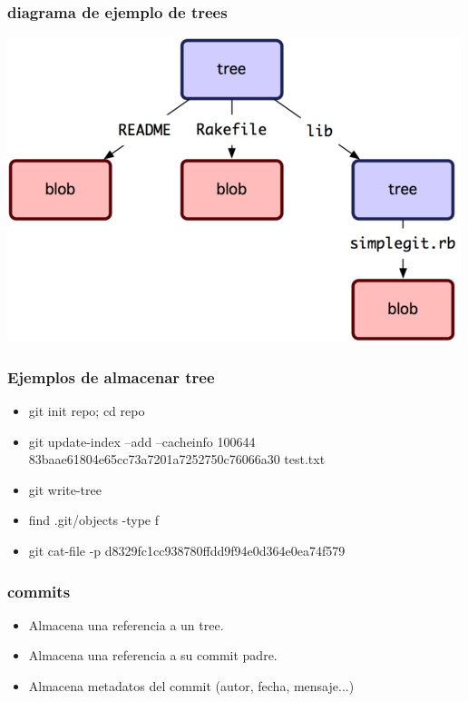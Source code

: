 \documentclass[10pt]{beamer}
\begin{document}
  \begin{frame}
    \frametitle{diagrama de ejemplo de trees}
    \begin{center}\includegraphics{trees.png}\end{center}
  \end{frame}

  \begin{frame}
    \frametitle{Ejemplos de almacenar tree}
    \begin{itemize}
        \item git init repo; cd repo
        \item git update-index --add --cacheinfo 100644 83baae61804e65cc73a7201a7252750c76066a30 test.txt
        \item git write-tree
        \item find .git/objects -type f
        \item git cat-file -p d8329fc1cc938780ffdd9f94e0d364e0ea74f579
    \end{itemize}
  \end{frame}

  \begin{frame}
    \frametitle{commits}
    \begin{itemize}
        \item Almacena una referencia a un tree.
        \item Almacena una referencia a su commit padre.
        \item Almacena metadatos del commit (autor, fecha, mensaje...)
    \end{itemize}
  \end{frame}
\end{document}
